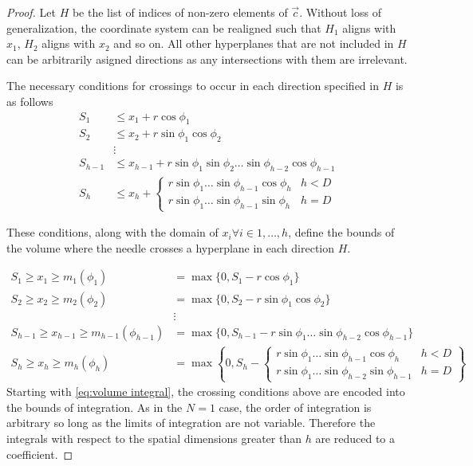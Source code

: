 \documentclass{article}
\begin{document}
\begin{proof}
	Let $H$ be the list of indices of non-zero elements of $\vec{c}$. 
	Without loss of generalization, the coordinate system can be realigned such that
	$H_1$ aligns with $x_1$, $H_2$ aligns with $x_2$ and so on. All other hyperplanes that are not included
	in $H$ can be arbitrarily asigned directions as any intersections with them are irrelevant.

	The necessary conditions for crossings to occur in each direction specified in $H$ is as follows
	\begin{align}
		S_1 &\le x_1 + r\cos\phi_1\\
		S_2 &\le x_2 + r\sin\phi_1\cos\phi_2\\
		&\vdots \\
		S_{h-1} &\le x_{h-1} + r\sin\phi_1\sin\phi_2\hdots\sin\phi_{h-2}\cos\phi_{h-1}\\
		S_{h} &\le x_h + \begin{cases}
			r\sin\phi_1\hdots\sin\phi_{h-1}\cos\phi_{h} & h < D \\
			r\sin\phi_1\hdots\sin\phi_{h-1}\sin\phi_{h} & h = D
		\end{cases}
	\end{align}

	These conditions, along with the domain of $x_i \forall i\in {1,\hdots,h}$, define the bounds of the
	volume where the needle crosses a hyperplane in each direction $H$.
	
	\begin{align}
		S_1 \ge x_1 \ge m_1(\phi_1) &= \max\{0, S_1-r\cos\phi_1\}\\
		S_2 \ge x_2 \ge m_2(\phi_2) &= \max\{0, S_2-r\sin\phi_1\cos\phi_2\}\\
		&\vdots \\
		S_{h-1} \ge x_{h-1} \ge m_{h-1}(\phi_{h-1}) &= \max\{0, S_{h-1}-r\sin\phi_1\hdots\sin\phi_{h-2}\cos\phi_{h-1}\}\\
		S_h \ge x_h \ge m_{h}(\phi_{h}) &= \max\left\{0, S_h - \begin{cases}
			r\sin\phi_1\hdots\sin\phi_{h-1}\cos\phi_{h} & h < D\\
			r\sin\phi_1\hdots\sin\phi_{h-2}\sin\phi_{h-1} & h = D
		\end{cases} \right\}
	\end{align}
	Starting with \ref{eq:volume integral}, the crossing conditions above are encoded into
	the bounds of integration. As in the $N=1$ case, the order of integration is arbitrary
	so long as the limits of integration are not variable. Therefore the integrals with respect to the
	spatial dimensions greater than $h$ are reduced to a coefficient.


\end{proof}
\end{document}

